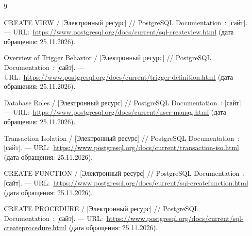\renewcommand{\refname}{Список использованных источников}
%
\begin{thebibliography}{9}

CREATE VIEW / [Электронный ресурс] // PostgreSQL Documentation~: [сайт]. --- URL\@:~\url{https://www.postgresql.org/docs/current/sql-createview.html} (дата обращения: 25.11.2026).

Overview of Trigger Behavior / [Электронный ресурс] // PostgreSQL Documentation~: [сайт]. --- URL\@:~\url{https://www.postgresql.org/docs/current/trigger-definition.html} (дата обращения: 25.11.2026).

Database Roles / [Электронный ресурс] // PostgreSQL Documentation~: [сайт]. --- URL\@:~\url{https://www.postgresql.org/docs/current/user-manag.html} (дата обращения: 25.11.2026).

Transaction Isolation / [Электронный ресурс] // PostgreSQL Documentation~: [сайт]. --- URL\@:~\url{https://www.postgresql.org/docs/current/transaction-iso.html} (дата обращения: 25.11.2026).

CREATE FUNCTION / [Электронный ресурс] // PostgreSQL Documentation~: [сайт]. --- URL\@:~\url{https://www.postgresql.org/docs/current/sql-createfunction.html} (дата обращения: 25.11.2026).

CREATE PROCEDURE / [Электронный ресурс] // PostgreSQL Documentation~: [сайт]. --- URL\@:~\url{https://www.postgresql.org/docs/current/sql-createprocedure.html} (дата обращения: 25.11.2026).

\end{thebibliography}
